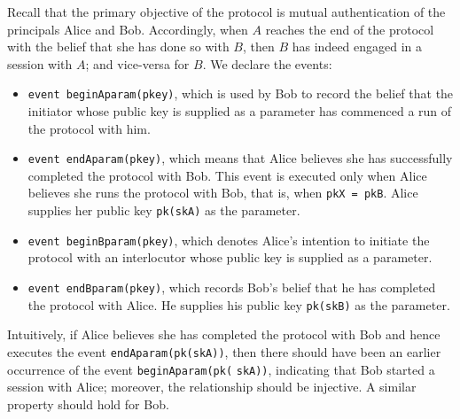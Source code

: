 \documentclass{book}
\newcommand{\A}{A}
\newcommand{\B}{B}
\begin{document}
Recall that the primary objective of the protocol is mutual authentication of the principals Alice and Bob. Accordingly, when $\A$ reaches the end of the protocol with the belief that she has done so with $\B$, then $\B$ has indeed engaged in a session with $\A$; and vice-versa for $\B$. We declare the events:
%
\begin{itemize}
	\item \lstinline!event beginAparam(pkey)!, which is used by Bob to record the belief that the initiator whose public key is supplied as a parameter has commenced a run of the protocol with him.

	\item \lstinline!event endAparam(pkey)!, which means that Alice believes she has successfully completed the protocol with Bob. This event is executed only when Alice believes she runs the protocol with Bob, that is, when \lstinline!pkX = pkB!. Alice supplies her public key \lstinline!pk(skA)! as the parameter.

	\item \lstinline!event beginBparam(pkey)!, which denotes Alice's intention to initiate the protocol with an interlocutor whose public key is supplied as a parameter.
	\item \lstinline!event endBparam(pkey)!, which records Bob's belief that he has completed the protocol with Alice. He supplies his public key \lstinline!pk(skB)! as the parameter.
\end{itemize}
%
Intuitively, if Alice believes she has completed the protocol with Bob and hence executes the event \lstinline!endAparam(pk(skA))!, then there should have been an earlier occurrence of the event \lstinline!beginAparam(pk(! \lstinline!skA))!, indicating that Bob started a session with Alice; moreover, the relationship should be injective. A similar property should hold for Bob.
\end{document}
